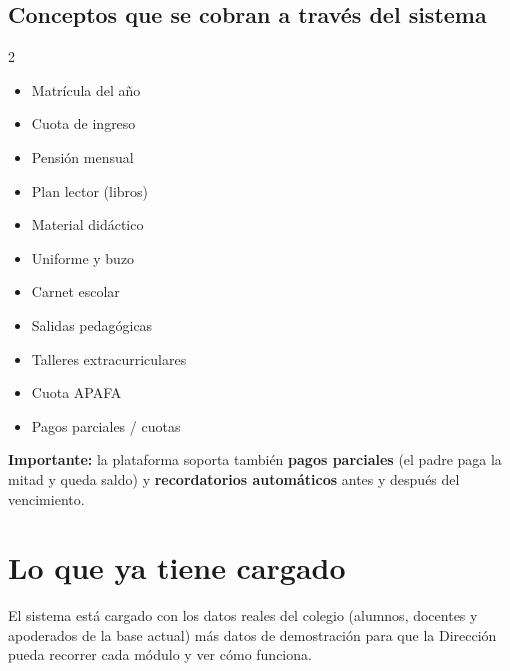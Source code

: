 \documentclass[11pt,a4paper]{article}
\begin{document}
\subsection*{Conceptos que se cobran a través del sistema}
\begin{multicols}{2}
\begin{itemize}
\item Matrícula del año
\item Cuota de ingreso
\item Pensión mensual
\item Plan lector (libros)
\item Material didáctico
\item Uniforme y buzo
\item Carnet escolar
\item Salidas pedagógicas
\item Talleres extracurriculares
\item Cuota APAFA
\item Pagos parciales / cuotas
\end{itemize}
\end{multicols}

\begin{accentbox}
\textbf{Importante:} la plataforma soporta también \textbf{pagos parciales} (el padre paga la mitad y queda saldo) y \textbf{recordatorios automáticos} antes y después del vencimiento.
\end{accentbox}

\section{Lo que ya tiene cargado}

El sistema está cargado con los datos reales del colegio (alumnos, docentes y apoderados de la base actual) más datos de demostración para que la Dirección pueda recorrer cada módulo y ver cómo funciona.
\end{document}
